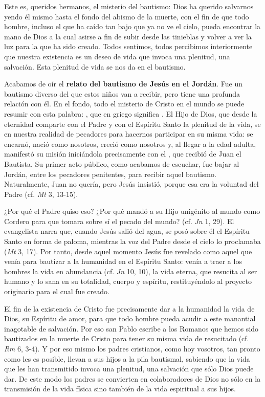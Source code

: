 \begin{body}
					Este es, queridos hermanos, el misterio del bautismo: Dios ha querido salvarnos yendo él mismo hasta el fondo del abismo de la muerte, con el fin de que todo hombre, incluso el que ha caído tan bajo que ya no ve el cielo, pueda encontrar la mano de Dios a la cual asirse a fin de subir desde las tinieblas y volver a ver la luz para la que ha sido creado. Todos sentimos, todos percibimos interiormente que nuestra existencia es un deseo de vida que invoca una plenitud, una salvación. Esta plenitud de vida se nos da en el bautismo.
					
					Acabamos de oír el \textbf{relato del bautismo de Jesús en el Jordán}. Fue un bautismo diverso del que estos niños van a recibir, pero tiene una profunda relación con él. En el fondo, todo el misterio de Cristo en el mundo se puede resumir con esta palabra: , que en griego significa . El Hijo de Dios, que desde la eternidad comparte con el Padre y con el Espíritu Santo la plenitud de la vida, se  en nuestra realidad de pecadores para hacernos participar en su misma vida: se encarnó, nació como nosotros, creció como nosotros y, al llegar a la edad adulta, manifestó su misión iniciándola precisamente con el , que recibió de Juan el Bautista. Su primer acto público, como acabamos de escuchar, fue bajar al Jordán, entre los pecadores penitentes, para recibir aquel bautismo. Naturalmente, Juan no quería, pero Jesús insistió, porque esa era la voluntad del Padre (cf. \emph{Mt} 3, 13-15).
					
					¿Por qué el Padre quiso eso? ¿Por qué mandó a su Hijo unigénito al mundo como Cordero para que tomara sobre sí el pecado del mundo? (cf. \emph{Jn} 1, 29). El evangelista narra que, cuando Jesús salió del agua, se posó sobre él el Espíritu Santo en forma de paloma, mientras la voz del Padre desde el cielo lo proclamaba  (\emph{Mt} 3, 17). Por tanto, desde aquel momento Jesús fue revelado como aquel que venía para bautizar a la humanidad en el Espíritu Santo: venía a traer a los hombres la vida en abundancia (cf. \emph{Jn} 10, 10), la vida eterna, que resucita al ser humano y lo sana en su totalidad, cuerpo y espíritu, restituyéndolo al proyecto originario para el cual fue creado.
					
					El fin de la existencia de Cristo fue precisamente dar a la humanidad la vida de Dios, su Espíritu de amor, para que todo hombre pueda acudir a este manantial inagotable de salvación. Por eso san Pablo escribe a los Romanos que hemos sido bautizados en la muerte de Cristo para tener su misma vida de resucitado (cf. \emph{Rm} 6, 3-4). Y por eso mismo los padres cristianos, como hoy vosotros, tan pronto como les es posible, llevan a sus hijos a la pila bautismal, sabiendo que la vida que les han transmitido invoca una plenitud, una salvación que sólo Dios puede dar. De este modo los padres se convierten en colaboradores de Dios no sólo en la transmisión de la vida física sino también de la vida espiritual a sus hijos.
					

\end{body}
